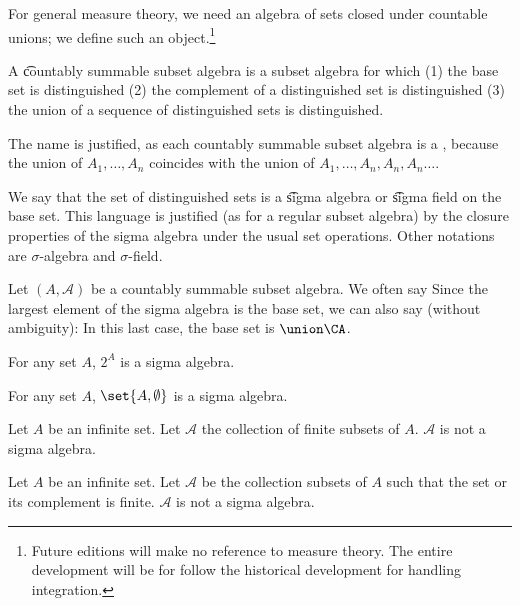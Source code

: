 

For general measure theory,
we need an algebra of sets
closed under countable unions;
we define such an object.\footnote{Future editions will make no reference to measure theory. The entire development will be for follow the historical development for handling integration.}


A \t{countably summable subset algebra}
is a subset algebra for which
(1) the base set is distinguished
(2) the complement of a distinguished
set is distinguished
(3) the union of a sequence of distinguished sets
is distinguished.

The name is justified, as
each countably summable subset algebra is a
,
because the union of $A_1, \dots, A_n$
coincides with the union of
$A_1, \dots, A_n, A_n, A_n \dots$.

We say that the set of distinguished sets is a \t{sigma algebra} or \t{sigma field} on the base set.
This language is justified (as for a regular subset algebra) by the closure properties of the sigma algebra under the usual set operations.
Other notations are $\sigma$-algebra and $\sigma$-field.


Let $(A, \mathcal{A})$ be a countably summable subset algebra.
We often say 
Since the largest element of the sigma algebra is the base set, we can also say (without ambiguity): 
In this last case, the base set is $\union \CA$.


\begin{expl}
  For any set $A$, $2^{A}$ is a sigma algebra.
\end{expl}

\begin{expl}
  For any set $A$,
  $\set{A, \emptyset}$ is a sigma algebra.
\end{expl}

\begin{expl}
  Let $A$ be an infinite set.
  Let $\mathcal{A}$ the collection
  of finite subsets of $A$.
  $\mathcal{A}$ is not a sigma algebra.
\end{expl}

\begin{expl}
  Let $A$ be an infinite set.
  Let $\mathcal{A}$ be the collection
  subsets of $A$ such that the set or its
  complement is finite.
  $\mathcal{A}$ is not a sigma algebra.
\end{expl}


